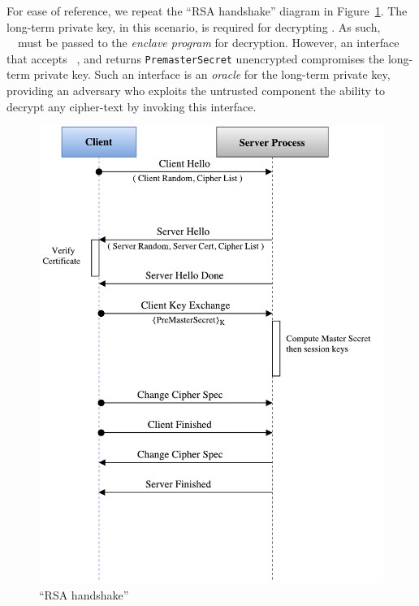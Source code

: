 \documentclass[../../main.tex]{subfiles}
\begin{document}
For ease of reference, we repeat the ``RSA handshake'' diagram in
Figure~\ref{fig:rsa-handshake-repeat}. The long-term private key, in
this scenario, is required for decrypting \premaster. As such,
~\premaster~must be passed to the \textit{enclave program} for
decryption. However, an interface that accepts ~\premaster, and
returns \texttt{PremasterSecret} unencrypted compromises the long-term
private key. Such an interface is an \textit{oracle} for the long-term
private key, providing an adversary who exploits the untrusted
component the ability to decrypt any cipher-text by invoking this
interface.

\begin{figure}[H]
  \centering
  \includegraphics[scale=0.4]{images/rsa-handshake-pristine.pdf}
  \caption{``RSA handshake''}
  \label{fig:rsa-handshake-repeat}
\end{figure}
\end{document}
